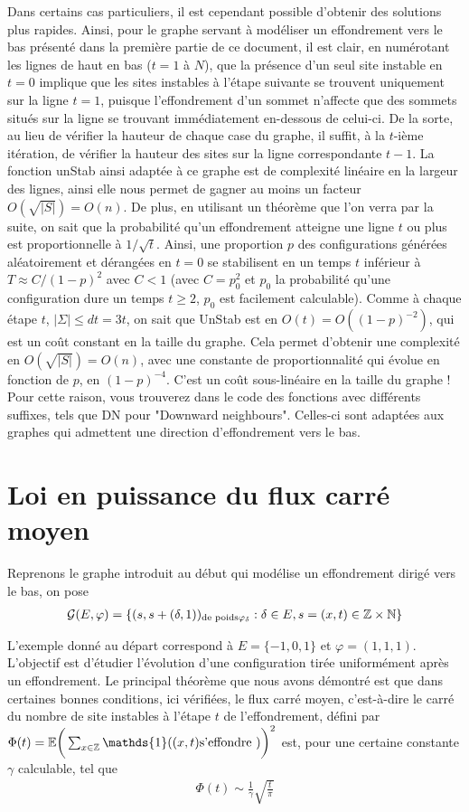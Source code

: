 \documentclass{article}
\begin{document}
Dans certains cas particuliers, il est cependant possible d’obtenir des solutions plus rapides. Ainsi, pour le graphe servant à modéliser un effondrement vers le bas présenté dans la première partie de ce document, il est clair, en numérotant les lignes de haut en bas ($t=1$ à $N$), que la présence d'un seul site instable en $t = 0$ implique que les sites instables à l'étape suivante se trouvent uniquement sur la ligne $t = 1$, puisque l'effondrement d’un sommet n'affecte que des sommets situés sur la ligne se trouvant immédiatement en-dessous de celui-ci. De la sorte, au lieu de vérifier la hauteur de chaque case du graphe, il suffit, à la $t$-ième itération, de vérifier la hauteur des sites sur la ligne correspondante $t-1$. La fonction unStab ainsi adaptée à ce graphe est de complexité linéaire en la largeur des lignes, ainsi elle nous permet de gagner au moins un facteur $O(\sqrt{|S|}) = O(n)$. 
De plus, en utilisant un théorème que l'on verra par la suite, on sait que la probabilité qu'un effondrement atteigne une ligne $t$ ou plus est proportionnelle à $1/\sqrt{t}$. Ainsi, une proportion $p$ des configurations générées aléatoirement et dérangées en $t=0$ se stabilisent en un temps $t$ inférieur à $T\approx C/(1-p)^2$ avec $C< 1$ (avec $C = p_0^2$ et $p_0$ la probabilité qu'une configuration dure un temps $t\geq 2$, $p_0$ est facilement calculable). 
Comme à chaque étape $t$,  $|\Sigma|\leq dt =3t$, on sait que UnStab est en $O(t)=O((1-p)^{-2})$, qui est un coût constant en la taille du graphe. Cela permet d'obtenir une complexité en  $O(\sqrt{|S|})=O(n)$, avec une constante de proportionnalité qui évolue en fonction de $p$, en $(1-p)^{-4}$. C'est un coût sous-linéaire en la taille du graphe !
Pour cette raison, vous trouverez dans le code des fonctions avec différents suffixes, tels que DN pour "Downward neighbours". Celles-ci sont adaptées aux graphes qui admettent une direction d'effondrement vers le bas.
\section{Loi en puissance du flux carré moyen}
Reprenons le graphe introduit au début qui modélise un effondrement dirigé vers le bas, on pose
\begin{align*}
\mathcal{G}(E, \varphi) = \{(s,s+(\delta,1))_{\textup{de poids} \varphi_\delta} : \delta\in E, s=(x,t)\in\mathbb{Z}\times\mathbb{N}\}
\end{align*}

L'exemple donné au départ correspond à $E= \{-1,0,1\}$ et $\varphi = (1, 1, 1)$. L'objectif est d'étudier l'évolution d'une configuration tirée uniformément après un effondrement. Le principal théorème que nous avons démontré est que dans certaines bonnes conditions, ici vérifiées, le flux carré moyen, c'est-à-dire le carré du nombre de site instables à l'étape $t$ de l'effondrement, défini par $\Phi(t) = \mathbb{E}\bigg(\sum_{x\in\mathbb{Z}} \mathds{1}((x,t) \textup{s'effondre })\bigg)^2$ est, pour une certaine constante $\gamma$ calculable, tel que
	\begin{align*}
		\Phi(t) \sim \frac{1}{\gamma}\sqrt{\frac{t}{\pi}}
	\end{align*}
\end{document}
